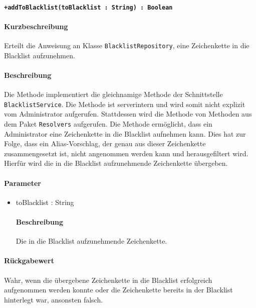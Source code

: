 \paragraph*{\texttt{+addToBlacklist(toBlacklist : String) : Boolean}}%
\paragraph*{Kurzbeschreibung}
Erteilt die Anweisung an Klasse \texttt{BlacklistRepository}, eine Zeichenkette in die Blacklist aufzunehmen.
\paragraph*{Beschreibung}
Die Methode implementiert die gleichnamige Methode der Schnittstelle \texttt{BlacklistService}.
Die Methode ist serverintern und wird somit nicht explizit vom Administrator aufgerufen.
Stattdessen wird die Methode von Methoden aus dem Paket \texttt{Resolvers} aufgerufen.
Die Methode ermöglicht, dass ein Administrator eine Zeichenkette in die Blacklist aufnehmen kann.
Dies hat zur Folge, dass ein Alias-Vorschlag, der genau aus dieser Zeichenkette zusammengesetzt ist, nicht angenommen werden kann und herausgefiltert wird.
Hierfür wird die in die Blacklist aufzunehmende Zeichenkette übergeben.
\paragraph*{Parameter}
\begin{itemize}
    \item toBlacklist : String
    		\paragraph*{Beschreibung}
    		Die in die Blacklist aufzunehmende Zeichenkette.
\end{itemize}
\paragraph*{Rückgabewert}
Wahr, wenn die übergebene Zeichenkette in die Blacklist erfolgreich aufgenommen werden konnte oder die Zeichenkette bereits in der Blacklist hinterlegt war, ansonsten falsch.
